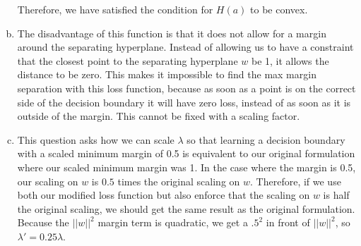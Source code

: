 \documentclass[letterpaper,11pt]{article}
\begin{document}
\begin{enumerate}[(a)]
\begin{enumerate}[i)]
\end{enumerate}
Therefore, we have satisfied the condition for $H(a)$ to be convex.
\item
The disadvantage of this function is that it does not allow for a margin around the separating hyperplane. Instead of allowing us to have a constraint that the closest point to the separating hyperplane $w$ be 1, it allows the distance to be zero. This makes it impossible to find the max margin separation with this loss function, because as soon as a point is on the correct side of the decision boundary it will have zero loss, instead of as soon as it is outside of the margin. This cannot be fixed with a scaling factor.

\item
This question asks how we can scale $\lambda$ so that learning a decision boundary with a scaled minimum margin of 0.5 is equivalent to our original formulation where our scaled minimum margin was 1. In the case where the margin is 0.5, our scaling on $w$ is $0.5$ times the original scaling on $w$. Therefore, if we use both our modified loss function but also enforce that the scaling on $w$ is half the original scaling, we should get the same result as the original formulation. Because the $||w||^2$ margin term is quadratic, we get a $.5^2$ in front of $||w||^2$, so $\lambda' = 0.25 \lambda$.
\end{enumerate}
\end{document}

